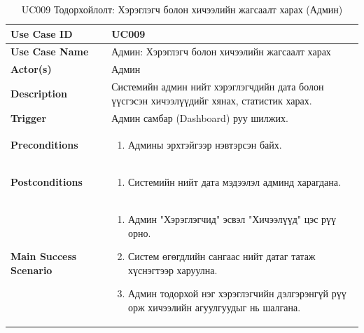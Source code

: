 \begin{longtable}{|p{4cm}|p{11cm}|}
\caption{UC009 Тодорхойлолт: Хэрэглэгч болон хичээлийн жагсаалт харах (Админ)} \\
\hline
\textbf{Use Case ID} & UC009 \\ \hline
\textbf{Use Case Name} & Админ: Хэрэглэгч болон хичээлийн жагсаалт харах \\ \hline
\textbf{Actor(s)} & Админ \\ \hline
\textbf{Description} & Системийн админ нийт хэрэглэгчдийн дата болон үүсгэсэн хичээлүүдийг хянах, статистик харах. \\ \hline
\textbf{Trigger} & Админ самбар (Dashboard) руу шилжих. \\ \hline
\textbf{Preconditions} & 
\begin{enumerate}
    \item Админы эрхтэйгээр нэвтэрсэн байх.
\end{enumerate} \\ \hline
\textbf{Postconditions} & 
\begin{enumerate}
    \item Системийн нийт дата мэдээлэл админд харагдана.
\end{enumerate} \\ \hline
\textbf{Main Success Scenario} & 
\begin{enumerate}
    \item Админ "Хэрэглэгчид" эсвэл "Хичээлүүд" цэс рүү орно.
    \item Систем өгөгдлийн сангаас нийт датаг татаж хүснэгтээр харуулна.
    \item Админ тодорхой нэг хэрэглэгчийн дэлгэрэнгүй рүү орж хичээлийн агуулгуудыг нь шалгана.
\end{enumerate} \\ \hline
\end{longtable}

